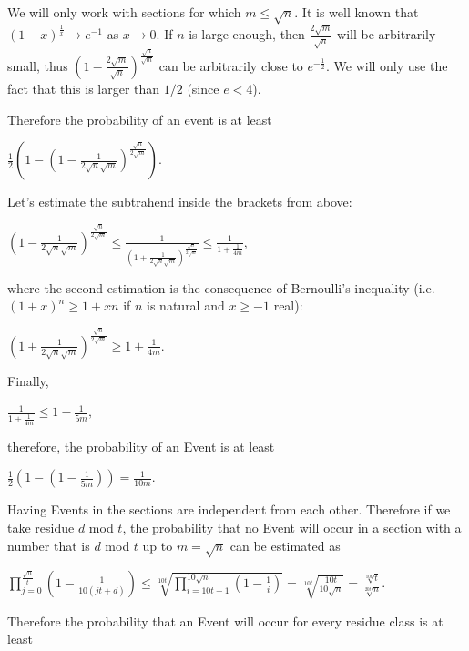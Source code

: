 \documentclass{article}
\begin{document}
We will only work with sections for which \(\displaystyle m\le \sqrt{n}\). It is well known that \(\displaystyle (1-x)^{\frac{1}{x}}\to e^{-1}\) as \(\displaystyle x\to 0\). If \(\displaystyle n\) is large enough, then \(\displaystyle \frac{2\sqrt{m}}{\sqrt{n}}\) will be arbitrarily small, thus \(\displaystyle (1-\frac{2\sqrt{m}}{\sqrt{n}})^{\frac{\sqrt{n}}{\sqrt{m}}}\) can be arbitrarily close to \(\displaystyle e^{-\frac{1}{2}}\). We will only use the fact that this is larger than \(\displaystyle 1/2\) (since \(\displaystyle e<4\)).

Therefore the probability of an event is at least

\(\displaystyle \frac{1}{2} \left(1-\left(1-\frac{1}{2\sqrt{n}\sqrt{m}}\right)^{\frac{\sqrt{n}}{2\sqrt{m}}}\right).\)

Let's estimate the subtrahend inside the brackets from above:

\(\displaystyle \left(1-\frac{1}{2\sqrt{n}\sqrt{m}}\right)^{\frac{\sqrt{n}}{2\sqrt{m}}}\le \frac{1}{\left(1+\frac{1}{2\sqrt{n}\sqrt{m}}\right)^{\frac{\sqrt{n}}{2\sqrt{m}}}}\le\frac{1}{1+\frac{1}{4m}},\)

where the second estimation is the consequence of Bernoulli's inequality (i.e. \(\displaystyle (1+x)^n\ge 1+xn\) if \(\displaystyle n\) is natural and \(\displaystyle x\ge -1\) real):

\(\displaystyle \left(1+\frac{1}{2\sqrt{n}\sqrt{m}}\right)^{\frac{\sqrt{n}}{2\sqrt{m}}}\ge 1+\frac{1}{4m}.\)

Finally,

\(\displaystyle \frac{1}{1+\frac{1}{4m}}\le 1-\frac{1}{5m},\)

therefore, the probability of an Event is at least

\(\displaystyle \frac{1}{2}\left(1-\left(1-\frac{1}{5m}\right)\right)=\frac{1}{10m}.\)

Having Events in the sections are independent from each other. Therefore if we take residue \(\displaystyle d\) mod \(\displaystyle t\), the probability that no Event will occur in a section with a number that is \(\displaystyle d\) mod \(\displaystyle t\) up to \(\displaystyle m=\sqrt{n}\) can be estimated as

\(\displaystyle \prod_{j=0}^{\frac{\sqrt{n}}{t}} \left(1-\frac{1}{10(jt+d)}\right)\le \sqrt[10t]{{\prod_{i=10t+1}^{10\sqrt{n}}} \left(1-\frac{1}{i}\right)}=\sqrt[10t]{\frac{10t}{10\sqrt{n}}}=\frac{\sqrt[10t]{t}}{\sqrt[20t]{n}}.\)

Therefore the probability that an Event will occur for every residue class is at least
\end{document}
